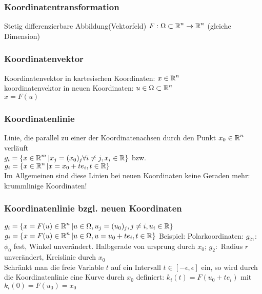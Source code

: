 \documentclass[german]{latex4ei/latex4ei_sheet}
\begin{document}
\subsubsection{Koordinatentransformation}
Stetig differenzierbare Abbildung(Vektorfeld) $F:\Omega \subset \operatorname{\mathbb R}^n \to \operatorname{\mathbb R}^n$ (gleiche Dimension)

\subsubsection{Koordinatenvektor}
Koordinatenvektor in kartesischen Koordinaten: $x \in \operatorname{\mathbb R}^n$\\
koordinatenvektor in neuen Koordinaten: $u \in \Omega \subset \operatorname{\mathbb R}^n$\\
$x=F(u)$

\subsubsection{Koordinatenlinie}
Linie, die parallel zu einer der Koordinatenachsen durch den Punkt $x_0\in \operatorname{\mathbb R}^n$ verl\"auft\\
$g_i=\{x\in\operatorname{\mathbb R}^m|x_j=(x_0)_j \forall i\neq j, x_i \in \operatorname{\mathbb R}\}$ bzw.\\
$g_i=\{x\in \operatorname{\mathbb R}^n | x=x_0+t e_i, t \in \operatorname{\mathbb R} \}$\\
Im Allgemeinen sind diese Linien bei neuen Koordinaten keine Geraden mehr: krummlinige Koordinaten!\\

\subsubsection{Koordinatenlinie bzgl. neuen Koordinaten}
$g_i=\{x=F(u) \in \operatorname{\mathbb R}^n | u \in \Omega, u_j=(u_0)_j, j\neq i, u_i\in \operatorname{\mathbb R}\}$\\
$g_i=\{x=F(u) \in \operatorname{\mathbb R}^n | u \in \Omega, u=u_0+t e_i, t \in \operatorname{\mathbb R}\}$
Beispiel: Polarkoordinaten: $g_21:$ $\phi_0$ fest, Winkel unver\"andert. Halbgerade von ursprung durch $x_0$; $g_2:$ Radius $r$ unver\"andert, Kreislinie durch $x_0$
\\


Schr\"ankt man die freie Variable $t$ auf ein Intervall $t\in [-\epsilon,\epsilon]$ ein, so wird durch die Koordinatenlinie eine Kurve durch $x_0$ definiert: $k_i(t)=F(u_0+t e_i)$ mit $k_i(0)=F(u_0)=x_0$
\end{document}
